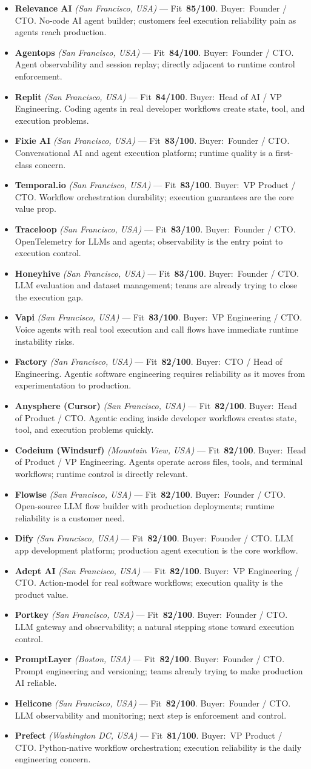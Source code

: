 \documentclass[10pt]{article}
\newcommand{\cand}[5]{\item \textbf{#1} \textit{(#2)} --- Fit~\textbf{#3/100}. Buyer:~#4. #5}
\begin{document}
\begin{itemize}
\cand{Relevance AI}{San Francisco, USA}{85}{Founder / CTO}{No-code AI agent builder; customers feel execution reliability pain as agents reach production.}
\cand{Agentops}{San Francisco, USA}{84}{Founder / CTO}{Agent observability and session replay; directly adjacent to runtime control enforcement.}
\cand{Replit}{San Francisco, USA}{84}{Head of AI / VP Engineering}{Coding agents in real developer workflows create state, tool, and execution problems.}
\cand{Fixie AI}{San Francisco, USA}{83}{Founder / CTO}{Conversational AI and agent execution platform; runtime quality is a first-class concern.}
\cand{Temporal.io}{San Francisco, USA}{83}{VP Product / CTO}{Workflow orchestration durability; execution guarantees are the core value prop.}
\cand{Traceloop}{San Francisco, USA}{83}{Founder / CTO}{OpenTelemetry for LLMs and agents; observability is the entry point to execution control.}
\cand{Honeyhive}{San Francisco, USA}{83}{Founder / CTO}{LLM evaluation and dataset management; teams are already trying to close the execution gap.}
\cand{Vapi}{San Francisco, USA}{83}{VP Engineering / CTO}{Voice agents with real tool execution and call flows have immediate runtime instability risks.}
\cand{Factory}{San Francisco, USA}{82}{CTO / Head of Engineering}{Agentic software engineering requires reliability as it moves from experimentation to production.}
\cand{Anysphere (Cursor)}{San Francisco, USA}{82}{Head of Product / CTO}{Agentic coding inside developer workflows creates state, tool, and execution problems quickly.}
\cand{Codeium (Windsurf)}{Mountain View, USA}{82}{Head of Product / VP Engineering}{Agents operate across files, tools, and terminal workflows; runtime control is directly relevant.}
\cand{Flowise}{San Francisco, USA}{82}{Founder / CTO}{Open-source LLM flow builder with production deployments; runtime reliability is a customer need.}
\cand{Dify}{San Francisco, USA}{82}{Founder / CTO}{LLM app development platform; production agent execution is the core workflow.}
\cand{Adept AI}{San Francisco, USA}{82}{VP Engineering / CTO}{Action-model for real software workflows; execution quality is the product value.}
\cand{Portkey}{San Francisco, USA}{82}{Founder / CTO}{LLM gateway and observability; a natural stepping stone toward execution control.}
\cand{PromptLayer}{Boston, USA}{82}{Founder / CTO}{Prompt engineering and versioning; teams already trying to make production AI reliable.}
\cand{Helicone}{San Francisco, USA}{82}{Founder / CTO}{LLM observability and monitoring; next step is enforcement and control.}
\cand{Prefect}{Washington DC, USA}{81}{VP Product / CTO}{Python-native workflow orchestration; execution reliability is the daily engineering concern.}

\end{itemize}
\end{document}
